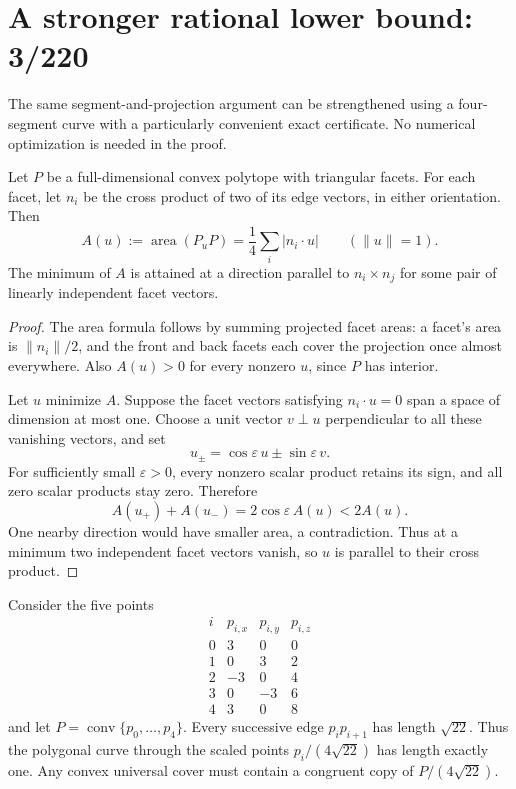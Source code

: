 \section{A stronger rational lower bound: 3/220}\label{sec:rational}

The same segment-and-projection argument can be strengthened using a
four-segment curve with a particularly convenient exact certificate.
No numerical optimization is needed in the proof.

\begin{lemma}
Let $P$ be a full-dimensional convex polytope with triangular facets.
For each facet, let $n_i$ be the cross product of two of its edge vectors,
in either orientation.  Then
\[
 A(u):=\operatorname{area}(P_uP)
 =\frac14\sum_i|n_i\cdot u|\qquad(\|u\|=1).
\]
The minimum of $A$ is attained at a direction parallel to $n_i\times n_j$
for some pair of linearly independent facet vectors.
\end{lemma}
\begin{proof}
The area formula follows by summing projected facet areas: a facet's area
is $\|n_i\|/2$, and the front and back facets each cover the projection
once almost everywhere.  Also $A(u)>0$ for every nonzero $u$, since
$P$ has interior.

Let $u$ minimize $A$. Suppose the facet vectors satisfying $n_i\cdot u=0$
span a space of dimension at most one. Choose a unit vector $v\perp u$
perpendicular to all these vanishing vectors, and set
\[
 u_\pm=\cos\varepsilon\,u\pm\sin\varepsilon\,v.
\]
For sufficiently small $\varepsilon>0$, every nonzero scalar product
retains its sign, and all zero scalar products stay zero. Therefore
\[
 A(u_+)+A(u_-)=2\cos\varepsilon\,A(u)<2A(u).
\]
One nearby direction would have smaller area, a contradiction. Thus
at a minimum two independent facet vectors vanish, so $u$ is parallel
to their cross product.
\end{proof}

Consider the five points
\[
\begin{array}{c|rrr}
i& p_{i,x}&p_{i,y}&p_{i,z}\\\hline
0& 3&0&0\\
1& 0&3&2\\
2&-3&0&4\\
3&0&-3&6\\
4&3&0&8
\end{array}
\]
and let $P=\operatorname{conv}\{p_0,\ldots,p_4\}$.
Every successive edge $p_ip_{i+1}$ has length $\sqrt{22}$.
Thus the polygonal curve through the scaled points
$p_i/(4\sqrt{22})$ has length exactly one.  Any convex universal
cover must contain a congruent copy of $P/(4\sqrt{22})$.

